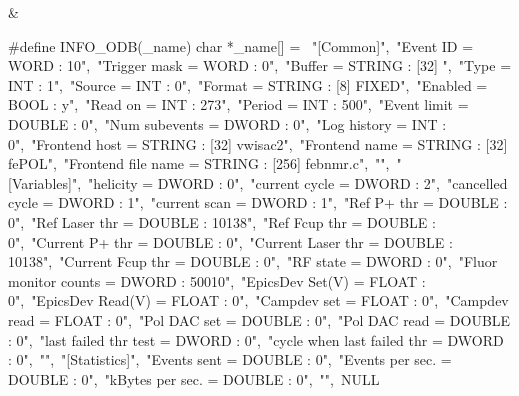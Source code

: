 \begin{TabularC}{2}
&
\begin{DoxyCode}
#define INFO_ODB(_name) char *_name[] = {\
"[Common]",\
"Event ID = WORD : 10",\
"Trigger mask = WORD : 0",\
"Buffer = STRING : [32] ",\
"Type = INT : 1",\
"Source = INT : 0",\
"Format = STRING : [8] FIXED",\
"Enabled = BOOL : y",\
"Read on = INT : 273",\
"Period = INT : 500",\
"Event limit = DOUBLE : 0",\
"Num subevents = DWORD : 0",\
"Log history = INT : 0",\
"Frontend host = STRING : [32] vwisac2",\
"Frontend name = STRING : [32] fePOL",\
"Frontend file name = STRING : [256] febnmr.c",\
"",\
"[Variables]",\
"helicity = DWORD : 0",\
"current cycle = DWORD : 2",\
"cancelled cycle = DWORD : 1",\
"current scan = DWORD : 1",\
"Ref P+ thr = DOUBLE : 0",\
"Ref Laser thr = DOUBLE : 10138",\
"Ref Fcup thr = DOUBLE : 0",\
"Current P+ thr = DOUBLE : 0",\
"Current Laser thr = DOUBLE : 10138",\
"Current Fcup thr = DOUBLE : 0",\
"RF state = DWORD : 0",\
"Fluor monitor counts = DWORD : 50010",\
"EpicsDev Set(V) = FLOAT : 0",\
"EpicsDev Read(V) = FLOAT : 0",\
"Campdev set = FLOAT : 0",\
"Campdev read = FLOAT : 0",\
"Pol DAC set = DOUBLE : 0",\
"Pol DAC read = DOUBLE : 0",\
"last failed thr test = DWORD : 0",\
"cycle when last failed thr = DWORD : 0",\
"",\
"[Statistics]",\
"Events sent = DOUBLE : 0",\
"Events per sec. = DOUBLE : 0",\
"kBytes per sec. = DOUBLE : 0",\
"",\
NULL }
\end{DoxyCode}
  \\\cline{1-2}
\end{TabularC}


